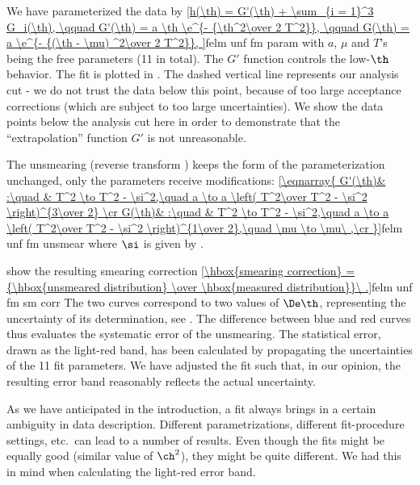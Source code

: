 We have parameterized the data by
\eqref{h(\th) = G'(\th) + \sum_{i = 1}^3 G_i(\th),
	\qquad G'(\th) = a \th \e^{- {\th^2\over 2 T^2}},
	\qquad G(\th) = a \e^{- {(\th - \mu) ^2\over 2 T^2}},
}{felm unf fm param}
with $a$, $\mu$ and $T$'s being the free parameters (11 in total). The $G'$ function controls the low-$\th$ behavior. The fit is plotted in . The dashed vertical line represents our analysis cut - we do not trust the data below this point, because of too large acceptance corrections (which are subject to too large uncertainties). We show the data points below the analysis cut here in order to demonstrate that the ``extrapolation'' function $G'$ is not unreasonable.

\bmfig
{}
\emfig

The unsmearing (reverse transform ) keeps the form of the parameterization  unchanged, only the parameters receive modifications:
\eqref{\eqnarray{
G'(\th)& :\quad & T^2 \to T^2 - \si^2,\quad a \to a \left( T^2\over T^2 - \si^2 \right)^{3\over 2} \cr
G(\th)& :\quad & T^2 \to T^2 - \si^2,\quad a \to a \left( T^2\over T^2 - \si^2 \right)^{1\over 2},\quad \mu \to \mu\ ,\cr
}}{felm unf fm unsmear}
where $\si$ is given by .

 show the resulting smearing correction
\eqref{\hbox{smearing correction} = {\hbox{unsmeared distribution} \over \hbox{measured distribution}}\ .}{felm unf fm sm corr}
The two curves correspond to two values of $\De\th$, representing the uncertainty of its determination, see . The difference between blue and red curves thus evaluates the systematic error of the unsmearing. The statistical error, drawn as the light-red band, has been calculated by propagating the uncertainties of the 11 fit parameters. We have adjusted the fit such that, in our opinion, the resulting error band reasonably reflects the actual uncertainty.

As we have anticipated in the introduction, a fit always brings in a certain ambiguity in data description. Different parametrizations, different fit-procedure settings, etc.~can lead to a number of results. Even though the fits might be equally good (similar value of $\ch^2$), they might be quite different. We had this in mind when calculating the light-red error band.

